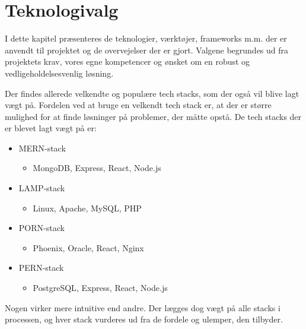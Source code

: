 \section{Teknologivalg}
I dette kapitel præsenteres de teknologier, værktøjer, frameworks m.m. der er anvendt til projektet
og de overvejelser der er gjort.
Valgene begrundes ud fra projektets krav, vores egne kompetencer og ønsket om en robust og vedligeholdelsesvenlig løsning.

Der findes allerede velkendte og populære tech stacks, som der også vil blive lagt vægt på.
Fordelen ved at bruge en velkendt tech stack er, at der er større mulighed for at finde løsninger på problemer, der måtte opstå.
De tech stacks der er blevet lagt vægt på er:
\begin{itemize}
    \item MERN-stack
    \begin{itemize}
        \item MongoDB, Express, React, Node.js
    \end{itemize}
    \item LAMP-stack
    \begin{itemize}
        \item Linux, Apache, MySQL, PHP
    \end{itemize}
    \item PORN-stack
    \begin{itemize}
        \item Phoenix, Oracle, React, Nginx
    \end{itemize}
    \item PERN-stack
    \begin{itemize}
        \item PostgreSQL, Express, React, Node.js
    \end{itemize}
\end{itemize}
Nogen virker mere intuitive end andre.
Der lægges dog vægt på alle stacks i processen, og hver stack vurderes ud fra de fordele og ulemper, den tilbyder.



